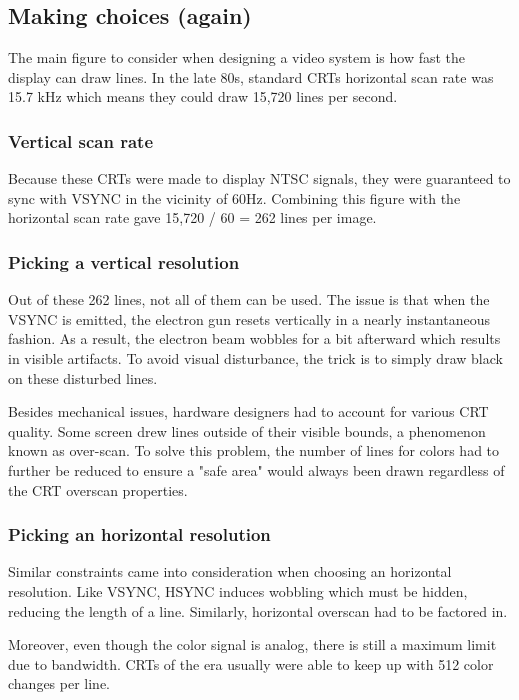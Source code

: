 \subsection{Making choices (again)}
 The main figure to consider when designing a video system is how fast the display can draw lines. In the late 80s, standard CRTs horizontal scan rate was 15.7 kHz which means they could draw 15,720 lines per second.





\subsubsection{Vertical scan rate}
Because these CRTs were made to display NTSC signals, they were guaranteed to sync with VSYNC in the vicinity of 60Hz. Combining this figure with the horizontal scan rate gave 15,720 / 60 = 262 lines per image.


\subsubsection{Picking a vertical resolution}
Out of these 262 lines, not all of them can be used. The issue is that when the VSYNC is emitted, the electron gun resets vertically in a nearly instantaneous fashion. As a result, the electron beam wobbles for a bit afterward which results in visible artifacts. To avoid visual disturbance, the trick is to simply draw black on these disturbed lines. 

Besides mechanical issues, hardware designers had to account for various CRT quality. Some screen drew lines outside of their visible bounds, a phenomenon known as over-scan. To solve this problem, the number of lines for colors had to further be reduced to ensure a "safe area" would always been drawn regardless of the CRT overscan properties.



\subsubsection{Picking an horizontal resolution}
Similar constraints came into consideration when choosing an horizontal resolution. Like VSYNC, HSYNC induces wobbling which must be hidden, reducing the length of a line. Similarly, horizontal overscan had to be factored in.

Moreover, even though the color signal is analog, there is still a maximum limit due to bandwidth. CRTs of the era usually were able to keep up with 512 color changes per line.

